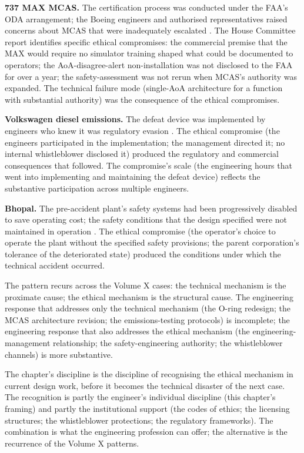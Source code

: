 \textbf{737 MAX MCAS.} The certification process was conducted under the FAA's ODA arrangement; the Boeing engineers and authorised representatives raised concerns about MCAS that were inadequately escalated \cite{acc:house-737max-2020}. The House Committee report identifies specific ethical compromises: the commercial premise that the MAX would require no simulator training shaped what could be documented to operators; the AoA-disagree-alert non-installation was not disclosed to the FAA for over a year; the safety-assessment was not rerun when MCAS's authority was expanded. The technical failure mode (single-AoA architecture for a function with substantial authority) was the consequence of the ethical compromises.

\textbf{Volkswagen diesel emissions.} The defeat device was implemented by engineers who knew it was regulatory evasion \cite{acc:epa-vw-nov-2015}. The ethical compromise (the engineers participated in the implementation; the management directed it; no internal whistleblower disclosed it) produced the regulatory and commercial consequences that followed. The compromise's scale (the engineering hours that went into implementing and maintaining the defeat device) reflects the substantive participation across multiple engineers.

\textbf{Bhopal.} The pre-accident plant's safety systems had been progressively disabled to save operating cost; the safety conditions that the design specified were not maintained in operation \cite{acc:icmr-bhopal-2004}. The ethical compromise (the operator's choice to operate the plant without the specified safety provisions; the parent corporation's tolerance of the deteriorated state) produced the conditions under which the technical accident occurred.

The pattern recurs across the Volume X cases: the technical mechanism is the proximate cause; the ethical mechanism is the structural cause. The engineering response that addresses only the technical mechanism (the O-ring redesign; the MCAS architecture revision; the emissions-testing protocols) is incomplete; the engineering response that also addresses the ethical mechanism (the engineering-management relationship; the safety-engineering authority; the whistleblower channels) is more substantive.

The chapter's discipline is the discipline of recognising the ethical mechanism in current design work, before it becomes the technical disaster of the next case. The recognition is partly the engineer's individual discipline (this chapter's framing) and partly the institutional support (the codes of ethics; the licensing structures; the whistleblower protections; the regulatory frameworks). The combination is what the engineering profession can offer; the alternative is the recurrence of the Volume X patterns.

